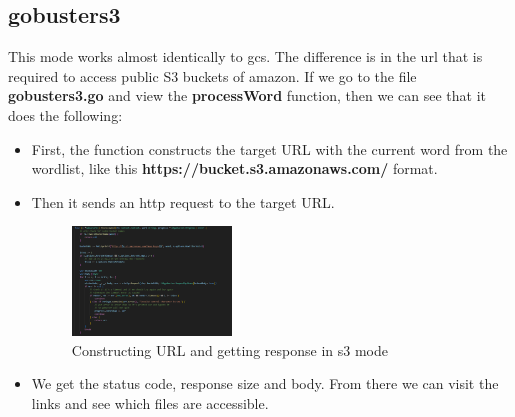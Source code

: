 \documentclass[12 pt]{article}
\begin{document}
\subsection{gobusters3}
This mode works almost identically to gcs. The difference is in the url that is required to access public S3 buckets of amazon. If we go to the file \textbf{gobusters3.go} and view the \textbf{processWord} function, then we can see that it does the following:
\begin{itemize}
    \item First, the function constructs the target URL with the current word from the wordlist, like this \textbf{https://bucket.s3.amazonaws.com/} format.
    \item Then it sends an http request to the target URL.
    \begin{figure}[!htbp]
        \centering
        \includegraphics[width=0.4\textwidth]{Gobusters3_processWord.png}
        \caption{Constructing URL and getting response in s3 mode}
        \label{fig: Gobusters3 processWord}
    \end{figure}
    \item We get the status code, response size and body. From there we can visit the links and see which files are accessible.
\end{itemize}
\end{document}
